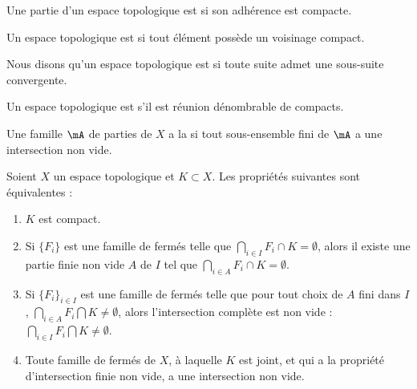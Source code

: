 \begin{definition}
    Une partie d'un espace topologique est  si son adhérence est compacte.
\end{definition}

\begin{definition}  \label{DefEIBYooAWoESf}
    Un espace topologique est  si tout élément possède un voisinage compact.
\end{definition}

\begin{definition}
    Nous disons qu'un espace topologique est  si toute suite admet une sous-suite convergente.
\end{definition}

\begin{definition}      \label{DefFCGBooLpnSAK}
    Un espace topologique est  s'il est réunion dénombrable de compacts.
\end{definition}

\begin{definition}
    Une famille \( \mA\) de parties de \( X\) a la  si tout sous-ensemble fini de \( \mA\) a une intersection non vide.
\end{definition}

\begin{proposition}\label{PropXKUMiCj}
    Soient \( X\) un espace topologique et \( K\subset X\). Les propriétés suivantes sont équivalentes :
    \begin{enumerate}
        \item\label{ItemXYmGHFai}
            \( K\) est compact.
        \item\label{ItemXYmGHFaii}
            Si \( \{ F_i \}\) est une famille de fermés telle que \( \bigcap_{i\in I}F_i \cap K =\emptyset\), alors il existe une partie finie non vide \( A\) de \( I\) tel que \( \bigcap_{i\in A}F_i \cap K =\emptyset\).
        \item\label{ItemXYmGHFaiii}
            Si \( \{ F_i \}_{i\in I}\) est une famille de fermés telle que pour tout choix de \( A\) fini dans \( I\), \( \bigcap_{i\in A}F_i \bigcap K \neq\emptyset\), alors l'intersection complète est non vide : \( \bigcap_{i\in I}F_i \bigcap K\neq\emptyset\).
        \item\label{ItemXYmGHFaiv}
            Toute famille de fermés de \( X \), à laquelle \( K \) est joint, et qui a la propriété d'intersection finie non vide, a une intersection non vide.
    \end{enumerate}
\end{proposition}

